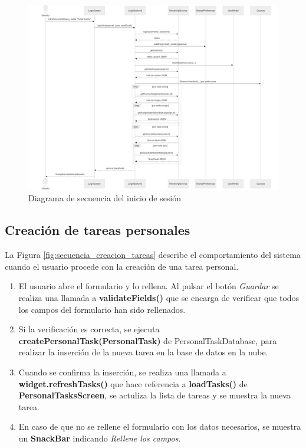 \begin{figure}[p]
    \centering
    \includegraphics[width=1.2\linewidth]{img/secuencia_login.png}
    \caption{Diagrama de secuencia del inicio de sesión}
    \label{fig:secuencia_login}
\end{figure}

\subsection{Creación de tareas personales}
La Figura \ref{fig:secuencia_creacion_tareas} describe el comportamiento del sistema cuando el usuario procede con la creación de una tarea personal.

\begin{enumerate}
    \item El usuario abre el formulario y lo rellena. Al pulsar el botón \textit{Guardar} se realiza una llamada a \textbf{validateFields()} que se encarga de verificar que todos los campos del formulario han sido rellenados.
    \item Si la verificación es correcta, se ejecuta \textbf{createPersonalTask(PersonalTask)} de PersonalTaskDatabase, para realizar la inserción de la nueva tarea en la base de datos en la nube.
    \item Cuando se confirma la inserción, se realiza una llamada a \textbf{widget.refreshTasks()} que hace referencia a \textbf{loadTasks()} de \textbf{PersonalTasksScreen}, se actuliza la lista de tareas y se muestra la nueva tarea.
    \item En caso de que no se rellene el formulario con los datos necesarios, se muestra un \textbf{SnackBar} indicando \textit{Rellene los campos}.
\end{enumerate}

